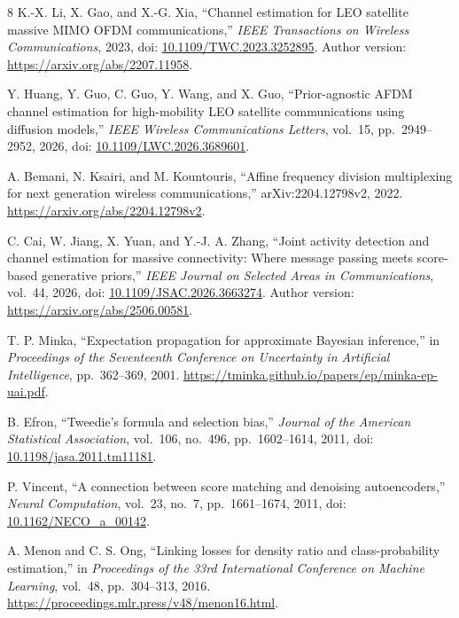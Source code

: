 \documentclass[10pt,a4paper]{article}
\begin{document}
\begin{thebibliography}{8}
K.-X. Li, X. Gao, and X.-G. Xia,
``Channel estimation for LEO satellite massive MIMO OFDM communications,''
\emph{IEEE Transactions on Wireless Communications}, 2023,
doi: \href{https://doi.org/10.1109/TWC.2023.3252895}{10.1109/TWC.2023.3252895}.
Author version: \url{https://arxiv.org/abs/2207.11958}.

Y. Huang, Y. Guo, C. Guo, Y. Wang, and X. Guo,
``Prior-agnostic AFDM channel estimation for high-mobility LEO satellite
communications using diffusion models,''
\emph{IEEE Wireless Communications Letters}, vol.~15,
pp.~2949--2952, 2026,
doi: \href{https://doi.org/10.1109/LWC.2026.3689601}{10.1109/LWC.2026.3689601}.

A. Bemani, N. Ksairi, and M. Kountouris,
``Affine frequency division multiplexing for next generation wireless
communications,'' arXiv:2204.12798v2, 2022.
\url{https://arxiv.org/abs/2204.12798v2}.

C. Cai, W. Jiang, X. Yuan, and Y.-J. A. Zhang,
``Joint activity detection and channel estimation for massive connectivity:
Where message passing meets score-based generative priors,''
\emph{IEEE Journal on Selected Areas in Communications}, vol.~44, 2026,
doi: \href{https://doi.org/10.1109/JSAC.2026.3663274}{10.1109/JSAC.2026.3663274}.
Author version: \url{https://arxiv.org/abs/2506.00581}.

T. P. Minka, ``Expectation propagation for approximate Bayesian inference,''
in \emph{Proceedings of the Seventeenth Conference on Uncertainty in
Artificial Intelligence}, pp.~362--369, 2001.
\url{https://tminka.github.io/papers/ep/minka-ep-uai.pdf}.

B. Efron, ``Tweedie's formula and selection bias,''
\emph{Journal of the American Statistical Association},
vol.~106, no.~496, pp.~1602--1614, 2011,
doi: \href{https://doi.org/10.1198/jasa.2011.tm11181}{10.1198/jasa.2011.tm11181}.

P. Vincent, ``A connection between score matching and denoising autoencoders,''
\emph{Neural Computation}, vol.~23, no.~7, pp.~1661--1674, 2011,
doi: \href{https://doi.org/10.1162/NECO_a_00142}{10.1162/NECO\_a\_00142}.

A. Menon and C. S. Ong,
``Linking losses for density ratio and class-probability estimation,''
in \emph{Proceedings of the 33rd International Conference on Machine Learning},
vol.~48, pp.~304--313, 2016.
\url{https://proceedings.mlr.press/v48/menon16.html}.
\end{thebibliography}
\end{document}
